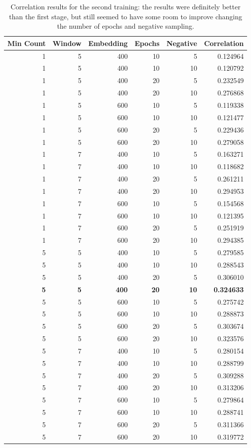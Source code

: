 \documentclass[11pt,oneside,a4paper]{article}
\begin{document}
\begin{table}[]
\centering
\begin{tabular}{@{}rrrrrr@{}}
\toprule
\multicolumn{1}{l}{Min Count} & \multicolumn{1}{l}{Window} & \multicolumn{1}{l}{Embedding} & \multicolumn{1}{l}{Epochs} & \multicolumn{1}{l}{Negative} & \multicolumn{1}{l}{Correlation} \\ \midrule
1 & 5 & 400 & 10 & 5 & 0.124964 \\
1 & 5 & 400 & 10 & 10 & 0.120792 \\
1 & 5 & 400 & 20 & 5 & 0.232549 \\
1 & 5 & 400 & 20 & 10 & 0.276868 \\
1 & 5 & 600 & 10 & 5 & 0.119338 \\
1 & 5 & 600 & 10 & 10 & 0.121477 \\
1 & 5 & 600 & 20 & 5 & 0.229436 \\
1 & 5 & 600 & 20 & 10 & 0.279058 \\
1 & 7 & 400 & 10 & 5 & 0.163271 \\
1 & 7 & 400 & 10 & 10 & 0.118682 \\
1 & 7 & 400 & 20 & 5 & 0.261211 \\
1 & 7 & 400 & 20 & 10 & 0.294953 \\
1 & 7 & 600 & 10 & 5 & 0.154568 \\
1 & 7 & 600 & 10 & 10 & 0.121395 \\
1 & 7 & 600 & 20 & 5 & 0.251919 \\
1 & 7 & 600 & 20 & 10 & 0.294385 \\
5 & 5 & 400 & 10 & 5 & 0.279585 \\
5 & 5 & 400 & 10 & 10 & 0.288543 \\
5 & 5 & 400 & 20 & 5 & 0.306010 \\
\textbf{5} & \textbf{5} & \textbf{400} & \textbf{20} & \textbf{10} & \textbf{0.324633} \\
5 & 5 & 600 & 10 & 5 & 0.275742 \\
5 & 5 & 600 & 10 & 10 & 0.288873 \\
5 & 5 & 600 & 20 & 5 & 0.303674 \\
5 & 5 & 600 & 20 & 10 & 0.323576 \\
5 & 7 & 400 & 10 & 5 & 0.280154 \\
5 & 7 & 400 & 10 & 10 & 0.288799 \\
5 & 7 & 400 & 20 & 5 & 0.309288 \\
5 & 7 & 400 & 20 & 10 & 0.313206 \\
5 & 7 & 600 & 10 & 5 & 0.279864 \\
5 & 7 & 600 & 10 & 10 & 0.288741 \\
5 & 7 & 600 & 20 & 5 & 0.311366 \\
5 & 7 & 600 & 20 & 10 & 0.319772 \\ \bottomrule
\end{tabular}
\caption{Correlation results for the second training: the results were definitely better than the first stage, but still seemed to have some room to improve changing the number of epochs and negative sampling.}
\label{tab:second-training}
\end{table}
\end{document}

